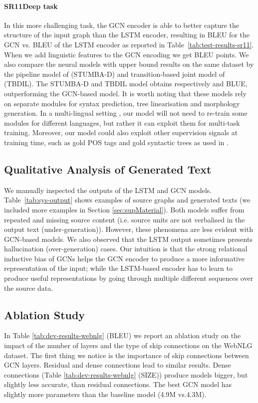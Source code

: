 \documentclass[11pt,a4paper,dvipsnames]{article}
\begin{document}
\paragraph{SR11Deep task}
In this more challenging task, the GCN encoder is able to better capture the structure of the input graph than the LSTM encoder, resulting in  BLEU for the GCN vs.  BLEU of the LSTM encoder as reported in Table~\ref{tab:test-results-sr11}.
When we add linguistic features to the GCN encoding we get  BLEU points.
We also compare the neural models with upper bound results on the same dataset by
the pipeline model of  
(STUMBA-D) and transition-based joint model of  (TBDIL).
The STUMBA-D and TBDIL model obtains respectively  and  BLUE, outperforming the GCN-based model.
It is worth noting that these models rely on separate modules for 
syntax prediction, tree linearisation and morphology generation.
In a multi-lingual setting \cite{mille2017shared},
our model will not need to re-train some modules for different languages, 
but rather it can exploit them for multi-task training.
Moreover, our model could also exploit other supervision signals at training time, 
such as gold POS tags and gold syntactic trees as used in .



\subsection{Qualitative Analysis of Generated Text}
We manually inspected the outputs of the LSTM and GCN models.
Table~\ref{tab:sys-output} shows examples of source graphs and generated texts 
(we included more examples in Section \ref{sec:supMaterial}).
Both models suffer from repeated and missing source content (i.e. source 
units are not verbalised in the output text (under-generation)).
However, these phenomena are less evident with GCN-based models. 
We also observed that the LSTM output sometimes presents hallucination 
(over-generation) cases.
Our intuition is that the strong relational inductive bias of GCNs \cite{battaglia2018relational} helps the GCN encoder to produce a more informative representation of the input; while the LSTM-based encoder has to learn to produce useful representations by going through multiple different sequences over the source data.


\subsection{Ablation Study}
In Table \ref{tab:dev-results-webnlg} (BLEU) we report an ablation study on the impact of the number of layers and the type of skip connections on the WebNLG dataset.
The first thing we notice is the importance of skip connections between GCN layers.
Residual and dense connections lead to similar results.
Dense connections (Table \ref{tab:dev-results-webnlg} (SIZE)) produce models bigger, but slightly less accurate, than residual connections.
The best GCN model has slightly more parameters than the baseline model (4.9M vs.4.3M).
\end{document}

